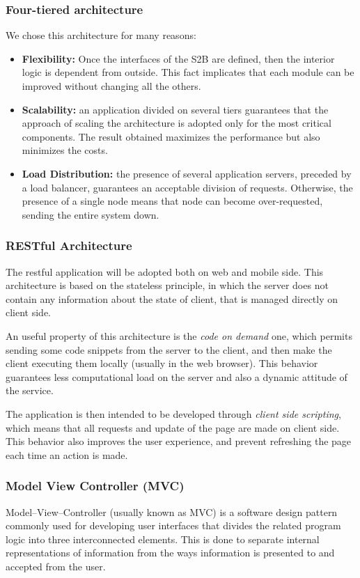 \subsubsection{Four-tiered architecture}
We chose this architecture for many reasons:
\begin{itemize}
    \item \textbf{Flexibility:} Once the interfaces of the S2B are defined, then the interior logic is dependent from outside. This fact implicates that each module can be improved without changing all the others.
    \item \textbf{Scalability:} an application divided on several tiers guarantees that the approach of scaling the architecture is adopted only for the most critical components. The result obtained maximizes the performance but also minimizes the costs.
    \item \textbf{Load Distribution:} the presence of several application servers, preceded by a load balancer, guarantees an acceptable division of requests. Otherwise, the presence of a single node means that node can become over-requested, sending the entire system down.
\end{itemize}

\subsubsection{RESTful Architecture}
\label{REST}
The restful application will be adopted both on web and mobile side. This architecture is based on the stateless principle, in which the server does not contain any information about the state of client, that is managed directly on client side.

An useful property of this architecture is the \textit{code on demand} one, which permits sending some code snippets from the server to the client, and then make the client executing them locally (usually in the web browser). This behavior guarantees less computational load on the server and also a dynamic attitude of the service.

The application is then intended to be developed through \textit{client side scripting}, which means that all requests and update of the page are made on client side. This behavior also improves the user experience, and prevent refreshing the page each time an action is made.

\subsubsection{Model View Controller (MVC)}
Model--View--Controller (usually known as MVC) is a software design pattern commonly used for developing user interfaces that divides the related program logic into three interconnected elements. This is done to separate internal representations of information from the ways information is presented to and accepted from the user.


